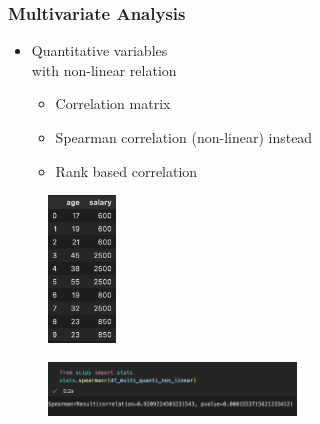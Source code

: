 \begin{frame}\frametitle{Multivariate Analysis}
   \begin{minipage}{0.48\linewidth}
      \begin{itemize}
         \item Quantitative variables\\
               with non-linear relation
         \begin{itemize}
            \item Correlation matrix
            \item Spearman correlation (non-linear) instead
            \item Rank based correlation
         \end{itemize}
      \end{itemize}
      \vspace{.5cm}
      \begin{figure}[H]
         \includegraphics[width=1.8cm]{../images/illustrations/pattern_multivariate_quantitative_non_linear_df.png}
      \end{figure}
   \end{minipage}
   \begin{minipage}{0.5\linewidth}
      \begin{figure}[H]
         \includegraphics[width=6.6cm]{../images/illustrations/pattern_multivariate_quantitative_non_linear_corr_spearman.png}
      \end{figure}
   \end{minipage}
\end{frame}


